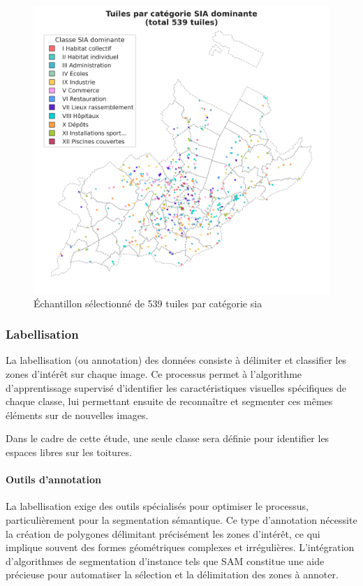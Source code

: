 \begin{figure}[H]
    \centering
    \includegraphics[width=1\linewidth]{02-main/figures/ch3/ch3_selection_donnees_04_selection_map_sia.png}
    \caption{Échantillon sélectionné de 539 tuiles par catégorie \gls{sia}}
    \label{fig:ch3_selection_donnees_04_selection_map_sia}
\end{figure}

\subsubsection{Labellisation}
La labellisation (ou annotation) des données consiste à délimiter et classifier les zones d'intérêt sur chaque image. Ce processus permet à l'algorithme d'apprentissage supervisé d'identifier les caractéristiques visuelles spécifiques de chaque classe, lui permettant ensuite de reconnaître et segmenter ces mêmes éléments sur de nouvelles images.

Dans le cadre de cette étude, une seule classe sera définie pour identifier les espaces libres sur les toitures.

\paragraph{Outils d'annotation}
La labellisation exige des outils spécialisés pour optimiser le processus, particulièrement pour la segmentation sémantique. Ce type d'annotation nécessite la création de polygones délimitant précisément les zones d'intérêt, ce qui implique souvent des formes géométriques complexes et irrégulières. L'intégration d'algorithmes de segmentation d'instance tels que SAM constitue une aide précieuse pour automatiser la sélection et la délimitation des zones à annoter.

